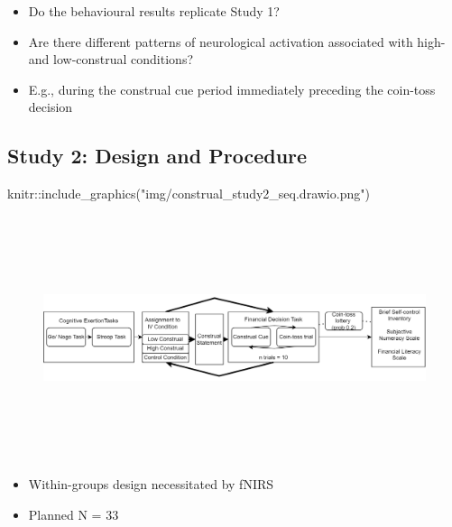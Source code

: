 \documentclass[
  letterpaper,
  DIV=11,
  numbers=noendperiod]{scrartcl}
\newenvironment{Shaded}{\begin{snugshade}}{\end{snugshade}}
\newcommand{\FunctionTok}[1]{\textcolor[rgb]{0.28,0.35,0.67}{#1}}
\newcommand{\NormalTok}[1]{\textcolor[rgb]{0.00,0.23,0.31}{#1}}
\newcommand{\SpecialCharTok}[1]{\textcolor[rgb]{0.37,0.37,0.37}{#1}}
\newcommand{\StringTok}[1]{\textcolor[rgb]{0.13,0.47,0.30}{#1}}
\providecommand{\tightlist}{%
  \setlength{\itemsep}{0pt}\setlength{\parskip}{0pt}}\usepackage{longtable,booktabs,array}
\begin{document}
\begin{itemize}
\item
  Do the behavioural results replicate Study 1?
\item
  Are there different patterns of neurological activation associated
  with high- and low-construal conditions?
\item
  E.g., during the construal cue period immediately preceding the
  coin-toss decision
\end{itemize}

\hypertarget{study-2-design-and-procedure}{%
\subsection{Study 2: Design and
Procedure}\label{study-2-design-and-procedure}}

\begin{Shaded}
\begin{Highlighting}[]
\NormalTok{knitr}\SpecialCharTok{::}\FunctionTok{include\_graphics}\NormalTok{(}\StringTok{"img/construal\_study2\_seq.drawio.png"}\NormalTok{)}
\end{Highlighting}
\end{Shaded}

\begin{figure}[H]

{\centering \includegraphics[width=13.54167in,height=2.8125in]{img/construal_study2_seq.drawio.png}

}

\end{figure}

\begin{itemize}
\tightlist
\item
  Within-groups design necessitated by fNIRS
\item
  Planned N = 33
\end{itemize}
\end{document}
